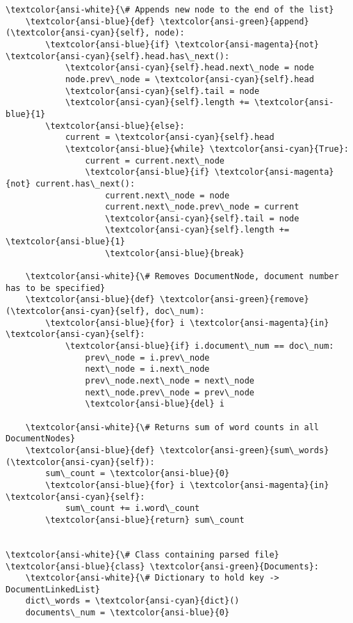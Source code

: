 \documentclass[11pt]{article}
\begin{document}
\begin{Verbatim}[commandchars=\\\{\}]
    \textcolor{ansi-white}{\# Appends new node to the end of the list}
    \textcolor{ansi-blue}{def} \textcolor{ansi-green}{append}(\textcolor{ansi-cyan}{self}, node):
        \textcolor{ansi-blue}{if} \textcolor{ansi-magenta}{not} \textcolor{ansi-cyan}{self}.head.has\_next():
            \textcolor{ansi-cyan}{self}.head.next\_node = node
            node.prev\_node = \textcolor{ansi-cyan}{self}.head
            \textcolor{ansi-cyan}{self}.tail = node
            \textcolor{ansi-cyan}{self}.length += \textcolor{ansi-blue}{1}
        \textcolor{ansi-blue}{else}:
            current = \textcolor{ansi-cyan}{self}.head
            \textcolor{ansi-blue}{while} \textcolor{ansi-cyan}{True}:
                current = current.next\_node
                \textcolor{ansi-blue}{if} \textcolor{ansi-magenta}{not} current.has\_next():
                    current.next\_node = node
                    current.next\_node.prev\_node = current
                    \textcolor{ansi-cyan}{self}.tail = node
                    \textcolor{ansi-cyan}{self}.length += \textcolor{ansi-blue}{1}
                    \textcolor{ansi-blue}{break}

    \textcolor{ansi-white}{\# Removes DocumentNode, document number has to be specified}
    \textcolor{ansi-blue}{def} \textcolor{ansi-green}{remove}(\textcolor{ansi-cyan}{self}, doc\_num):
        \textcolor{ansi-blue}{for} i \textcolor{ansi-magenta}{in} \textcolor{ansi-cyan}{self}:
            \textcolor{ansi-blue}{if} i.document\_num == doc\_num:
                prev\_node = i.prev\_node
                next\_node = i.next\_node
                prev\_node.next\_node = next\_node
                next\_node.prev\_node = prev\_node
                \textcolor{ansi-blue}{del} i

    \textcolor{ansi-white}{\# Returns sum of word counts in all DocumentNodes}
    \textcolor{ansi-blue}{def} \textcolor{ansi-green}{sum\_words}(\textcolor{ansi-cyan}{self}):
        sum\_count = \textcolor{ansi-blue}{0}
        \textcolor{ansi-blue}{for} i \textcolor{ansi-magenta}{in} \textcolor{ansi-cyan}{self}:
            sum\_count += i.word\_count
        \textcolor{ansi-blue}{return} sum\_count


\textcolor{ansi-white}{\# Class containing parsed file}
\textcolor{ansi-blue}{class} \textcolor{ansi-green}{Documents}:
    \textcolor{ansi-white}{\# Dictionary to hold key -> DocumentLinkedList}
    dict\_words = \textcolor{ansi-cyan}{dict}()
    documents\_num = \textcolor{ansi-blue}{0}


\end{Verbatim}
\end{document}
